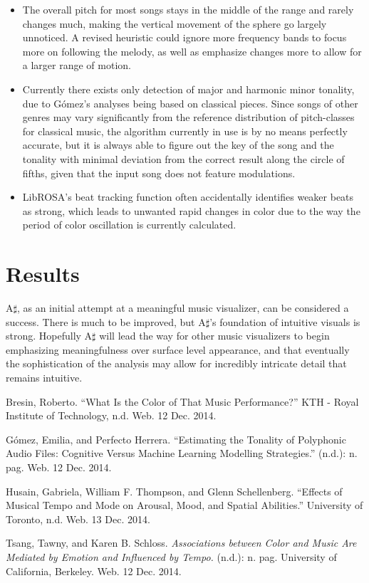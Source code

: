 \documentclass{article}
\begin{document}
\begin{itemize}
    \item The overall pitch for most songs stays in the middle of the range and rarely changes much, making the vertical movement of the sphere go largely unnoticed. A revised heuristic could ignore more frequency bands to focus more on following the melody, as well as emphasize changes more to allow for a larger range of motion.

    \item Currently there exists only detection of major and harmonic minor tonality, due to G\'{o}mez's \cite{gomez} analyses being based on classical pieces. Since songs of other genres may vary significantly from the reference distribution of pitch-classes for classical music, the algorithm currently in use is by no means perfectly accurate, but it is always able to figure out the key of the song and the tonality with minimal deviation from the correct result along the circle of fifths, given that the input song does not feature modulations.

    \item LibROSA's beat tracking function often accidentally identifies weaker beats as strong, which leads to unwanted rapid changes in color due to the way the period of color oscillation is currently calculated.
\end{itemize}

\section{Results}

A$\sharp$, as an initial attempt at a meaningful music visualizer, can be considered a success. There is much to be improved, but A$\sharp$'s foundation of intuitive visuals is strong. Hopefully A$\sharp$ will lead the way for other music visualizers to begin emphasizing meaningfulness over surface level appearance, and that eventually the sophistication of the analysis may allow for incredibly intricate detail that remains intuitive.

\begin{thebibliography}{9}

    Bresin, Roberto.
    ``What Is the Color of That Music Performance?''
    KTH - Royal Institute of Technology, n.d. Web. 12 Dec. 2014.

    G\'{o}mez, Emilia, and Perfecto Herrera.
    ``Estimating the Tonality of Polyphonic Audio Files: Cognitive Versus Machine Learning Modelling Strategies.''
    (n.d.): n. pag. Web. 12 Dec. 2014.

    Husain, Gabriela, William F. Thompson, and Glenn Schellenberg.
    ``Effects of Musical Tempo and Mode on Arousal, Mood, and Spatial Abilities.''
    University of Toronto, n.d. Web. 13 Dec. 2014.

    Tsang, Tawny, and Karen B. Schloss.
    \emph{Associations between Color and Music Are Mediated by Emotion and Influenced by Tempo.}
    (n.d.): n. pag.
    University of California, Berkeley. Web. 12 Dec. 2014.

\end{thebibliography}
\end{document}

